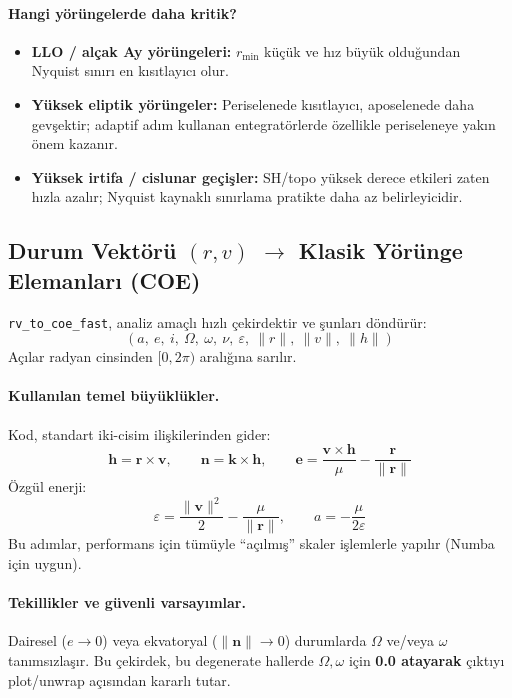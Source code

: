 \paragraph{Hangi yörüngelerde daha kritik?}
\begin{itemize}
\item \textbf{LLO / alçak Ay yörüngeleri:} \(r_{\min}\) küçük ve hız büyük olduğundan Nyquist sınırı en kısıtlayıcı olur.
\item \textbf{Yüksek eliptik yörüngeler:} Periselenede kısıtlayıcı, aposelenede daha gevşektir; adaptif adım kullanan entegratörlerde özellikle periseleneye yakın önem kazanır.
\item \textbf{Yüksek irtifa / cislunar geçişler:} SH/topo yüksek derece etkileri zaten hızla azalır; Nyquist kaynaklı sınırlama pratikte daha az belirleyicidir.
\end{itemize}

\subsection*{Durum Vektörü \texorpdfstring{$(r,v)$}{(r,v)} \texorpdfstring{$\rightarrow$}{->} Klasik Yörünge Elemanları (COE)}
\texttt{rv\_to\_coe\_fast}, analiz amaçlı hızlı çekirdektir ve şunları döndürür:
\[
(a,\ e,\ i,\ \Omega,\ \omega,\ \nu,\ \varepsilon,\ \|r\|,\ \|v\|,\ \|h\|)
\]
Açılar radyan cinsinden \([0,2\pi)\) aralığına sarılır. 

\paragraph{Kullanılan temel büyüklükler.}
Kod, standart iki-cisim ilişkilerinden gider:
\[
\mathbf{h}=\mathbf{r}\times\mathbf{v},\qquad
\mathbf{n}=\mathbf{k}\times\mathbf{h},\qquad
\mathbf{e}=\frac{\mathbf{v}\times\mathbf{h}}{\mu}-\frac{\mathbf{r}}{\|\mathbf{r}\|}
\]
Özgül enerji:
\[
\varepsilon=\frac{\|\mathbf{v}\|^2}{2}-\frac{\mu}{\|\mathbf{r}\|},\qquad
a=-\frac{\mu}{2\varepsilon}
\]
Bu adımlar, performans için tümüyle ``açılmış'' skaler işlemlerle yapılır (Numba için uygun).

\paragraph{Tekillikler ve güvenli varsayımlar.}
Dairesel (\(e\to 0\)) veya ekvatoryal (\(\|\mathbf{n}\|\to 0\)) durumlarda \(\Omega\) ve/veya \(\omega\) tanımsızlaşır. Bu çekirdek, bu degenerate hallerde \(\Omega,\omega\) için \textbf{0.0 atayarak} çıktıyı plot/unwrap açısından kararlı tutar. 

